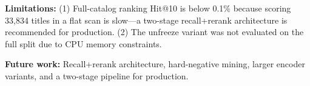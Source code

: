 \documentclass[conference]{IEEEtran}
\begin{document}
\noindent\textbf{Limitations:} (1) Full-catalog ranking Hit@10 is below 0.1\%
because scoring 33,834 titles in a flat scan is slow---a two-stage
recall+rerank architecture is recommended for production. (2) The unfreeze
variant was not evaluated on the full split due to CPU memory constraints.

\noindent\textbf{Future work:} Recall+rerank architecture, hard-negative
mining, larger encoder variants, and a two-stage pipeline for production.

{
\footnotesize


}
\end{document}
